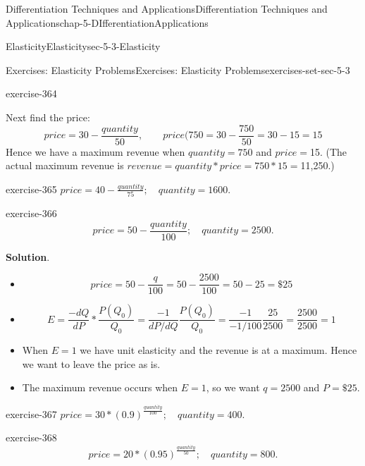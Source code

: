 \documentclass[oneside,10pt,]{book}
\numberwithin{equation}{section}
\begin{document}
\begin{chapterptx}{Differentiation Techniques and Applications}{}{Differentiation Techniques and Applications}{}{}{chap-5-DIfferentiationApplications}
\begin{sectionptx}{Elasticity}{}{Elasticity}{}{}{sec-5-3-Elasticity}
\begin{exercises-subsection-numberless}{Exercises: Elasticity Problems}{}{Exercises: Elasticity Problems}{}{}{exercises-set-sec-5-3}
\begin{divisionexercise}{1}{}{}{exercise-364}
\begin{itemize}[label=\textbullet]
Next find the price:%
%
\begin{equation*}
price=30-\frac{quantity}{50},\qquad price(750=30-\frac{750}{50}=30-15=15
\end{equation*}
\hypertarget{p-2072}{}%
Hence we have a maximum revenue when \(quantity=750\) and \(price=\)\textdollar{}15. (The actual maximum revenue is \(revenue=quantity*price=750*15=\)\textdollar{}11,250.)%
\end{itemize}
\end{divisionexercise}%
\begin{divisionexercise}{2}{}{}{exercise-365}%
\(price=40-\frac{quantity}{75};\quad quantity=1600.\)\end{divisionexercise}%
\begin{divisionexercise}{3}{}{}{exercise-366}%
%
\begin{equation*}
price=50-\frac{quantity}{100};\quad quantity=2500.
\end{equation*}
\par\smallskip%
\noindent\textbf{Solution}.\hypertarget{solution-184}{}\quad%
\leavevmode%
\begin{itemize}[label=\textbullet]
\item{}%
\begin{equation*}
price=50-\frac{q}{100}=50-\frac{2500}{100}=50-25=\$25
\end{equation*}
%
\item{}%
\begin{equation*}
E=\frac{-d Q}{d P}*\frac{P(Q_0 )}{Q_0} = \frac{-1}{dP/dQ} \frac{P(Q_0 )}{Q_0} = \frac{-1}{-1/100}  \frac{25}{2500}=\frac{2500}{2500}=1
\end{equation*}
%
\item{}\hypertarget{p-2073}{}%
When \(E = 1\) we have unit elasticity and the revenue is at a maximum. Hence we want to leave the price as is.%
\item{}\hypertarget{p-2074}{}%
The maximum revenue occurs when \(E = 1\), so we want \(q = 2500\) and \(P = \$25\).%
\end{itemize}
\end{divisionexercise}%
\begin{divisionexercise}{4}{}{}{exercise-367}%
\(price=30*(0.9)^{\frac{quantity}{100} };\quad quantity=400.\)\end{divisionexercise}%
\begin{divisionexercise}{5}{}{}{exercise-368}%
%
\begin{equation*}
price=20*(0.95)^{\frac{quantity}{50} };\quad quantity=800.
\end{equation*}

\end{divisionexercise}
\end{exercises-subsection-numberless}
\end{sectionptx}
\end{chapterptx}
\end{document}
